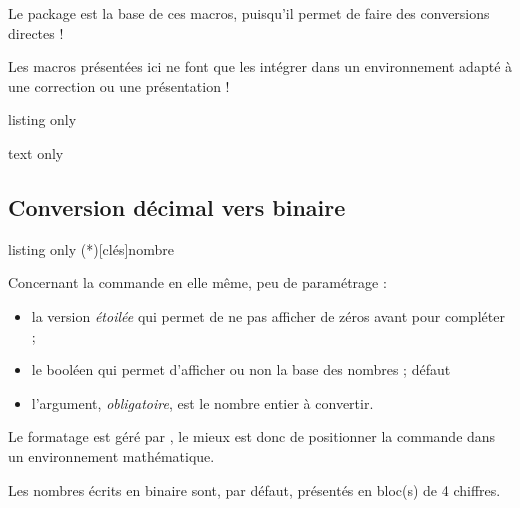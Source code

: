 \begin{noteblock}
Le package  est la base de ces macros, puisqu'il permet de faire des conversions directes !

\smallskip

Les macros présentées ici ne font que les intégrer dans un environnement adapté à une correction ou une présentation !
\end{noteblock}

\begin{PresCodeTexPL}{listing only}
\end{PresCodeTexPL}

\begin{PresCodeSortiePL}{text only}






\end{PresCodeSortiePL}

\subsection{Conversion décimal vers binaire}

\begin{PresCodeTexPL}{listing only}
\ConversionDecBin(*)[clés]{nombre}
\end{PresCodeTexPL}

\begin{cautionblock}
Concernant la commande en elle même, peu de paramétrage :

\begin{itemize}
\item la version \textit{étoilée} qui permet de ne pas afficher de zéros avant pour \og compléter \fg{} ;
\item le booléen  qui permet d'afficher ou non la base des nombres ; \hfill{}défaut 
\item l'argument, \textit{obligatoire}, est le nombre entier à convertir.
\end{itemize}

Le formatage est géré par , le mieux est donc de positionner la commande dans un environnement mathématique.

\smallskip

Les nombres écrits en binaire sont, par défaut, présentés en bloc(s) de 4 chiffres.
\end{cautionblock}


